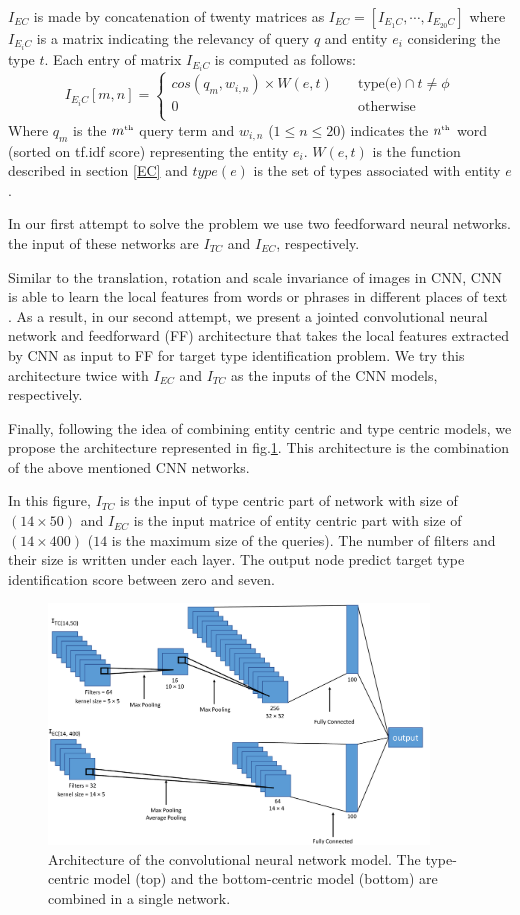 $I_{EC}$ is made by concatenation of twenty matrices as $I_{EC} = [I_{E_1C},\cdots, I_{E_{20}C}]$ where $I_{E_iC}$ is a matrix indicating the relevancy of query $q$ and entity $e_i$ considering the type $t$. Each entry of matrix $I_{E_iC}$ is computed as follows:
\begin{equation}
I_{E_iC}[m,n] = 
\begin{cases}
cos(q_m,w_{i,n}) \times W(e,t) &\quad\text{type(e)} \cap t \neq \phi \\
0 &\quad\text{otherwise} \\
\end{cases}
\end{equation}
Where $q_m$ is the $m^{\text{\tiny th}}$ query term and $w_{i,n}$ ($1\leq n \leq20$) indicates the $n^{\text{\tiny th}}$ word (sorted on tf.idf score) representing the entity $e_i$. $W(e,t)$ is the function  described in section \ref{EC} and $type(e)$ is the set of types associated with entity $e$.


In our first attempt to solve the problem we use two feedforward neural networks. the input of these networks are $I_{TC}$ and $I_{EC}$, respectively.


Similar to the translation, rotation and scale invariance of images in CNN, CNN is able to learn the local features from words or phrases in different places of text \cite{wang2016combination}. As a result, in our second attempt, we present a jointed convolutional neural network and feedforward (FF) architecture that takes the local features extracted by CNN as input to FF for target type identification problem. We try this architecture twice with $I_{EC}$ and $I_{TC}$ as the inputs of the CNN models, respectively.

Finally, following the idea of combining entity centric and type centric models\cite{Balog:2011:QME:2037661.2037667,Garigliotti:2017:TTI:3077136.3080659}, we propose the architecture represented in fig.\ref{proposeModel}. This architecture is the combination of the above mentioned CNN networks.

In this figure, $I_{TC}$ is the input of type centric part of network with size of $(14\times50)$ and $I_{EC}$ is the input matrice of entity centric part with size of $(14\times400)$ ($14$ is the maximum size of the queries). The number of filters and their size is written under each layer. The output node predict target type identification score between zero and seven.

\begin{figure}
	\includegraphics[width=0.9\textwidth]{1111modelFinalVisualize.pdf} \caption{Architecture of the convolutional neural network model. The type-centric model (top) and the bottom-centric model (bottom) are combined in a single network.}
	\label{proposeModel}
\end{figure}
